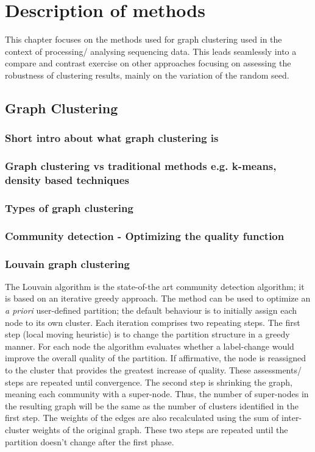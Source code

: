 \chapter{Description of methods}

This chapter focuses on the methods used for graph clustering used in the context of processing/ analysing sequencing data. This leads seamlessly into a compare and contrast exercise on other approaches focusing on assessing the robustness of clustering results, mainly on the variation of the random seed.

\section{Graph Clustering}

\subsection*{Short intro about what graph clustering is}

\subsection*{Graph clustering vs traditional methods e.g. k-means, density based techniques}

\subsection*{Types of graph clustering}

\subsection*{Community detection - Optimizing the quality function}

\subsection{Louvain graph clustering}
The Louvain algorithm \cite{Blondel2008b} is the state-of-the art community detection algorithm; it is based on an iterative greedy approach. The method can be used to optimize an \textit{a priori} user-defined partition; the default behaviour is to initially assign each node to its own cluster.
Each iteration comprises two repeating steps. The first step (local moving heuristic) is to change the partition structure in a greedy manner. For each node the algorithm evaluates whether a label-change would improve the overall quality of the partition. If affirmative, the node is reassigned to the cluster that provides the greatest increase of quality. These assessments/ steps are repeated until convergence. The second step is shrinking the graph, meaning each community with a super-node. Thus, the number of super-nodes in the resulting graph will be the same as the number of clusters identified in the first step. The weights of the edges are also recalculated using the sum of inter-cluster weights of the original graph.
These two steps are repeated until the partition doesn't change after the first phase.

